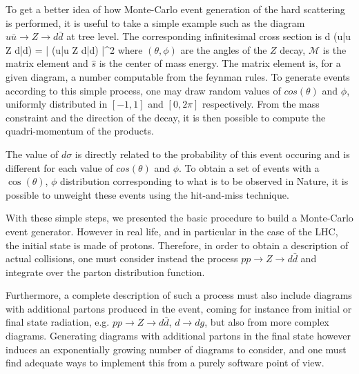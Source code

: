             To get a better idea of how Monte-Carlo event generation of the hard scattering
            is performed, it is useful to take a simple example such as the diagram
            $u\bar{u} \rightarrow Z \rightarrow d\bar{d}$ at tree level. The corresponding
            infinitesimal cross section is
            {
                d \sigma(u\bar{u} \rightarrow Z \rightarrow d\bar{d})
                =
                \left|
                    (u\bar{u} \rightarrow Z \rightarrow d\bar{d})
                \right|^2
            }
            where $(\theta,\phi)$ are the angles of the $Z$ decay, $\mathcal{M}$
            is the matrix element and $\hat{s}$ is the center of mass energy. The matrix
            element is, for a given diagram, a number computable from the feynman rules.
            To generate events according to this simple process, one may draw random
            values of $cos(\theta)$ and $\phi$, uniformly distributed in $[-1, 1]$ and
            $[0,2\pi]$ respectively. From the mass constraint and the direction of the
            decay, it is then possible to compute the quadri-momentum of the products.

            The value of $d\sigma$ is directly related to the probability of this event
            occuring and is different for each value of $cos(\theta)$ and $\phi$. To obtain
            a set of events with a $\cos(\theta)$, $\phi$ distribution corresponding to
            what is to be observed in Nature, it is possible to unweight these events using
            the hit-and-miss technique.

            With these simple steps, we presented the basic procedure to build a Monte-Carlo
            event generator. However in real life, and in particular in the case of the
            LHC, the initial state is made of protons. Therefore, in order to obtain a
            description of actual collisions, one must consider instead the process
            $pp \rightarrow Z \rightarrow d\bar{d}$ and integrate over the parton distribution
            function.

            Furthermore, a complete description of such a process must also include
            diagrams with additional partons produced in the event, coming for instance
            from initial or final state radiation, e.g. $pp \rightarrow Z \rightarrow
            d\bar{d}$, $d\rightarrow dg$, but also from more complex diagrams. Generating
            diagrams with additional partons in the final state however induces an exponentially growing
            number of diagrams to consider, and one must find adequate ways to implement
            this from a purely software point of view.

